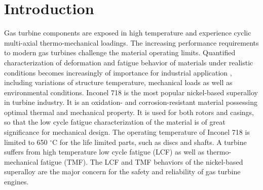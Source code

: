 \section{Introduction}
\noindent Gas turbine components are exposed in high temperature and experience cyclic multi-axial thermo-mechanical loadings. The increasing performance requirements to modern gas turbines challenge  the material operating limits. Quantified characterization of deformation and fatigue behavior of materials under realistic conditions becomes increasingly of importance for industrial application \cite{harrison1996modelling}, including variations of structure temperature, mechanical loads as well as environmental conditions. Inconel 718 is the most popular nickel-based superalloy in turbine industry. It is an oxidation- and corrosion-resistant material possessing optimal thermal and mechanical property. It is used for both rotors and casings, so that the low cycle fatigue characterization of the material is of great significance for mechanical design. The operating temperature of Inconel 718 is limited to 650 $^{\circ}$C for the life limited parts, such as discs and shafts.
A turbine suffers from high temperature low cycle fatigue (LCF) as well as thermo-mechanical fatigue (TMF).
The LCF and TMF behaviors of the nickel-based superalloy are the major concern for the safety and reliability of gas turbine engines.

